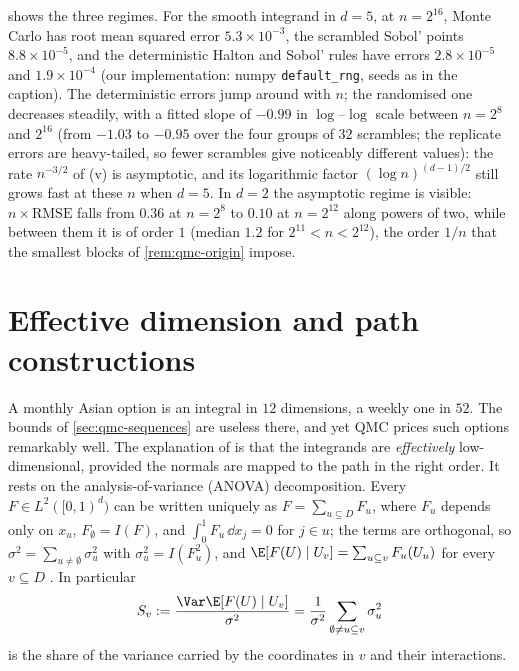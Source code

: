  shows the three regimes. For the smooth integrand in $d=5$, at
$n=2^{16}$, Monte Carlo has root mean squared error $5.3\times10^{-3}$, the scrambled Sobol'
points $8.8\times10^{-5}$, and the deterministic Halton and Sobol' rules have errors
$2.8\times10^{-5}$ and $1.9\times10^{-4}$ (our implementation: numpy \texttt{default\_rng}, seeds as
in the caption). The deterministic errors jump around with $n$; the randomised one decreases
steadily, with a fitted slope of $-0.99$ in $\log$--$\log$ scale between $n=2^8$ and $2^{16}$
(from $-1.03$ to $-0.95$ over the four groups of $32$ scrambles; the replicate errors are
heavy-tailed, so fewer scrambles give noticeably different values):
the rate $n^{-3/2}$ of (v) is asymptotic, and its logarithmic factor $(\log n)^{(d-1)/2}$ still
grows fast at these $n$ when $d=5$. In $d=2$ the asymptotic regime is visible:
$n\times\text{RMSE}$ falls from $0.36$ at $n=2^8$ to $0.10$ at $n=2^{12}$ along powers of two,
while between them it is of order $1$ (median $1.2$ for $2^{11}<n<2^{12}$), the order $1/n$
that the smallest blocks of \cref{rem:qmc-origin} impose.


\section{Effective dimension and path constructions}\label{sec:qmc-effective}

A monthly Asian option is an integral in $12$ dimensions, a weekly one in $52$. The bounds of
\cref{sec:qmc-sequences} are useless there, and yet QMC prices such options remarkably well.
The explanation of \textcite{caflisch-morokoff-owen} is that the integrands are
\emph{effectively} low-dimensional, provided the normals are mapped to the path in the right
order. It rests on the analysis-of-variance (ANOVA) decomposition. Every $F\in
L^2([0,1)^d)$ can be written uniquely as $F=\sum_{u\subseteq D}F_u$, where $F_u$ depends only
on $x_u$, $F_\emptyset=I(F)$, and $\int_0^1F_u\,\dd x_j=0$ for $j\in u$; the terms are
orthogonal, so $\sigma^2=\sum_{u\ne\emptyset}\sigma_u^2$ with $\sigma_u^2=I(F_u^2)$, and
$\E[F(U)\mid U_v]=\sum_{u\subseteq v}F_u(U_u)$ for every $v\subseteq D$
\citep{sobol-2001}. In particular
\begin{equation}\label{eq:qmc-closed-share}
  S_v:=\frac{\Var\E[F(U)\mid U_v]}{\sigma^2}=\frac1{\sigma^2}\sum_{\emptyset\ne u\subseteq v}\sigma_u^2
\end{equation}
is the share of the variance carried by the coordinates in $v$ and their interactions.

